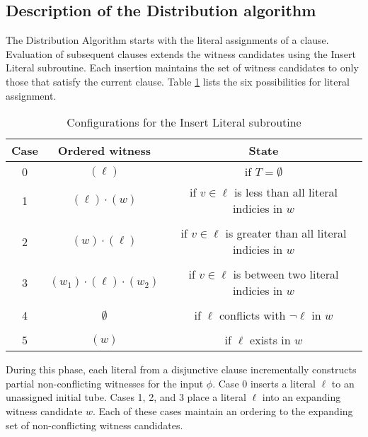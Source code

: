 
\FloatBarrier

	\subsection{Description of the Distribution algorithm}
		
The {\sc Distribution Algorithm} starts with the literal assignments of a clause.  Evaluation of subsequent clauses extends the witness candidates using the {\sc Insert Literal} subroutine.  Each insertion maintains the set of witness candidates to only those that satisfy the current clause.  Table \ref{distributionInsertTable} lists the six possibilities for literal assignment.
	
\begin{table}[htdp]
\caption{Configurations for the {\sc Insert Literal} subroutine}
\begin{center}
\begin{tabular}{|c|c|c|}
\hline
\textbf{Case} & \textbf{Ordered witness} & \textbf{State} \\ \hline 
0	& $(\ell)$ & if $T=\emptyset$ \\ \hline
1	& $(\ell) \cdot (w)$ & if $v \in \ell$ is less than all literal indicies in $w$ \\ 
& &  \\ \hline
2	& $(w) \cdot (\ell)$ & if $v \in \ell$ is greater than all literal indicies in $w$ \\ 
& &  \\ \hline
3	& $(w_1) \cdot (\ell) \cdot (w_2)$ & if $v \in \ell$ is between two literal indicies in $w$ \\ 
& &  \\ \hline
4	& $\emptyset$ & if $\ell$ conflicts with $\neg \ell$ in $w$\\
& &  \\ \hline
5	& $(w)$ & if $\ell$ exists in $w$\\ \hline
\end{tabular}
\end{center}
\label{distributionInsertTable}
\end{table}%

\FloatBarrier

		
During this phase, each literal from a disjunctive clause incrementally constructs partial non-conflicting witnesses for the input $\phi$.  Case 0 inserts a literal $\ell$ to an unassigned initial tube.  Cases 1, 2, and 3 place a literal $\ell$ into an expanding witness candidate $w$.  Each of these cases maintain an ordering to the expanding set of non-conflicting witness candidates.

